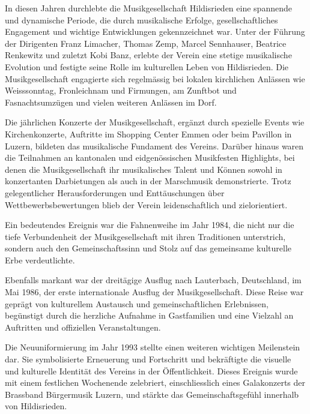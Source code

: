 \begin{history}

    In diesen Jahren durchlebte die Musikgesellschaft Hildisrieden eine
    spannende und dynamische Periode, die durch musikalische Erfolge,
    gesellschaftliches Engagement und wichtige Entwicklungen gekennzeichnet war.
    Unter der Führung der Dirigenten Franz Limacher, Thomas Zemp, Marcel
    Sennhauser, Beatrice Renkewitz und zuletzt Kobi Banz, erlebte der Verein
    eine stetige musikalische Evolution und festigte seine Rolle im kulturellen
    Leben von Hildisrieden. Die Musikgesellschaft engagierte sich regelmässig
    bei lokalen kirchlichen Anlässen wie Weisssonntag, Fronleichnam und
    Firmungen, am Zunftbot und Fasnachtsumzügen und vielen weiteren Anlässen im
    Dorf.

    Die jährlichen Konzerte der Musikgesellschaft, ergänzt durch spezielle
    Events wie Kirchenkonzerte, Auftritte im Shopping Center Emmen oder beim
    Pavillon in Luzern, bildeten das musikalische Fundament des Vereins. Darüber
    hinaus waren die Teilnahmen an kantonalen und eidgenössischen Musikfesten
    Highlights, bei denen die Musikgesellschaft ihr musikalisches Talent und
    Können sowohl in konzertanten Darbietungen als auch in der Marschmusik
    demonstrierte. Trotz gelegentlicher Herausforderungen und Enttäuschungen
    über Wettbewerbsbewertungen blieb der Verein leidenschaftlich und
    zielorientiert.

    Ein bedeutendes Ereignis war die Fahnenweihe im Jahr 1984, die nicht nur die
    tiefe Verbundenheit der Musikgesellschaft mit ihren Traditionen unterstrich,
    sondern auch den Gemeinschaftssinn und Stolz auf das gemeinsame kulturelle
    Erbe verdeutlichte.

    Ebenfalls markant war der dreitägige Ausflug nach Lauterbach, Deutschland,
    im Mai 1986, der erste internationale Ausflug der Musikgesellschaft. Diese
    Reise war geprägt von kulturellem Austausch und gemeinschaftlichen
    Erlebnissen, begünstigt durch die herzliche Aufnahme in Gastfamilien und
    eine Vielzahl an Auftritten und offiziellen Veranstaltungen.

    Die Neuuniformierung im Jahr 1993 stellte einen weiteren wichtigen
    Meilenstein dar. Sie symbolisierte Erneuerung und Fortschritt und
    bekräftigte die visuelle und kulturelle Identität des Vereins in der
    Öffentlichkeit. Dieses Ereignis wurde mit einem festlichen Wochenende
    zelebriert, einschliesslich eines Galakonzerts der Brassband Bürgermusik
    Luzern, und stärkte das Gemeinschaftsgefühl innerhalb von Hildisrieden.


\end{history}
